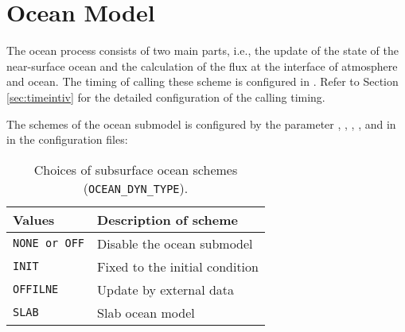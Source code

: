 \section{Ocean Model} \label{sec:basic_usel_ocean}
The ocean process consists of two main parts, i.e., the update of the state of the near-surface ocean and the calculation of the flux at the interface of atmosphere and ocean.
The timing of calling these scheme is configured in . Refer to Section \ref{sec:timeintiv} for the detailed configuration of the calling timing.

The schemes of the ocean submodel is configured by the parameter , , , , and  in  in the configuration files:


\begin{table}[h]
\begin{center}
  \caption{Choices of subsurface ocean schemes (\texttt{OCEAN\_DYN\_TYPE}).}
  \label{tab:nml_ocean_dyn}
  \begin{tabularx}{150mm}{lX} \hline
    \rowcolor[gray]{0.9}  Values & Description of scheme \\ \hline
      \verb|NONE or OFF| & Disable the ocean submodel \\
      \verb|INIT|        & Fixed to the initial condition \\
      \verb|OFFILNE|     & Update by external data \\
      \verb|SLAB|        & Slab ocean model \\
    \hline
  \end{tabularx}
\end{center}
\end{table}

